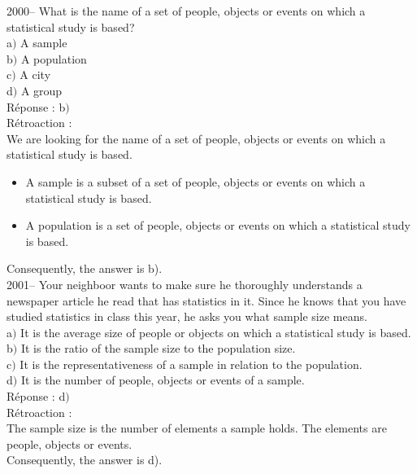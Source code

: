 \documentclass[letterpaper, 12pt]{article}
\begin{document}
2000-- What is the name of a set of people, objects or events on which a statistical study is based? \\

a$)$ A sample \\
b$)$ A population \\
c$)$ A city \\
d$)$ A group \\

R\'eponse : b$)$ \\

R\'etroaction :\\
We are looking for the name of a set of people, objects or events on which a statistical study is based. \\

\begin{itemize}
 \item A sample is a subset of a set of people, objects or events on which a statistical study is based. \\
\item A population is a set of people, objects or events on which a statistical study is based.\\
\end{itemize}
Consequently, the answer is b).\\

2001--  Your neighboor wants to make sure he thoroughly understands a newspaper article he read that has statistics in it. Since he knows that you have studied statistics in class this year, he asks you what sample size means.\\

a$)$  It is the average size of people or objects on which a statistical study is based.\\
b$)$  It is the ratio of the sample size to the population size.\\
c$)$  It is the representativeness of a sample in relation to the population.\\
d$)$  It is the number of people, objects or events of a sample. \\

R\'eponse : d$)$ \\

R\'etroaction :\\
The sample size is the number of elements a sample holds. The elements are people, objects or events. \\
Consequently, the answer is d). \\
\end{document}

